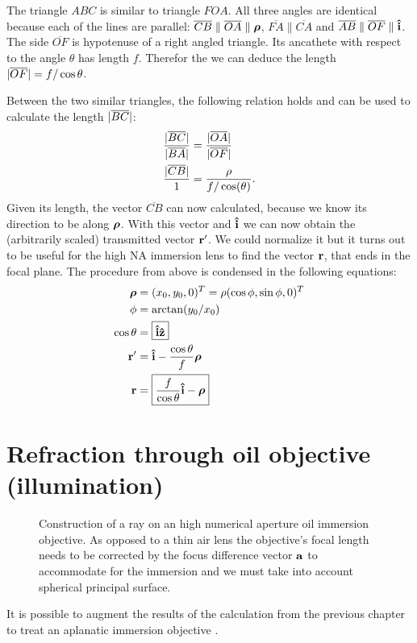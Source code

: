 The triangle $ABC$ is similar to triangle $FOA$. All three angles are
identical because each of the lines are parallel:
$\overline{CB} \parallel \overline{OA} \parallel \boldsymbol\rho$,
$\overline{FA} \parallel \overline{CA}$ and $\overline{AB} \parallel
\overline{OF} \parallel \mathbf{\hat{i}}$. The side $\overline{OF}$ is hypotenuse
of a right angled triangle. Its ancathete with respect to the angle
$\theta$ has length $f$. Therefor the we can deduce the length
$\mathopen| \overline{OF} \mathclose|=f/\cos\theta$.

Between the two similar triangles, the following relation holds and
can be used to calculate the length $\mathopen| \overline{BC} \mathclose|$:
\begin{align}
  \frac{\mathopen| \overline{BC} \mathclose|}{\mathopen| \overline{BA} \mathclose|}&=
  \frac{\mathopen| \overline{OA} \mathclose|}{\mathopen| \overline{OF} \mathclose|}\\
  \frac{\mathopen| \overline{CB} \mathclose|}{1}&=
  \frac{\rho}{f/\cos(\theta)}.
\end{align}
Given its length, the vector $\overline{CB}$ can now calculated,
because we know its direction to be along $\boldsymbol\rho$. With this vector
and $\mathbf{\hat{i}}$ we can now obtain the (arbitrarily scaled) transmitted vector
$\mathbf{r}'$. We could normalize it but it turns out to be useful for the
high NA immersion lens to find the vector $\mathbf{r}$, that ends in the focal
plane.  The procedure from above is condensed in the following
equations:
\begin{align}
  \boldsymbol\rho&=(x_0,y_0,0)^T=\rho (\cos\phi,\sin\phi,0)^T\\
  \phi&=\arctan(y_0/x_0)\\
  \cos\theta&=\boxed{\mathbf{\hat{i}}\mathbf{\hat{z}}}\\
  \mathbf{r}'&=\mathbf{\hat{i}}- \frac{\cos\theta}{f}\boldsymbol\rho\\
  \mathbf{r}&=\boxed{\frac{f}{\cos\theta} \mathbf{\hat{i}} -\boldsymbol\rho}
\end{align}

\section{Refraction through oil objective (illumination)}
\begin{figure}[!hbt]
  \centering
  
  \caption{Construction of a ray on an high numerical aperture oil
    immersion objective. As opposed to a thin air lens the objective's
    focal length needs to be corrected by the focus difference vector
    $\mathbf{a}$ to accommodate for the immersion and we must take into
    account spherical principal surface.}
\end{figure}
It is possible to augment the results of the calculation from the
previous chapter to treat an aplanatic immersion objective
\citep{Hwang2008}.

